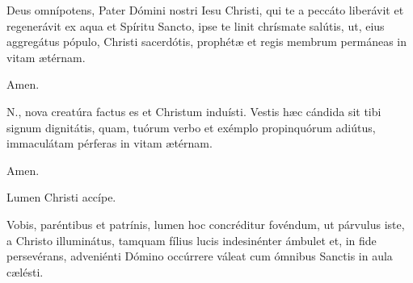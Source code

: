 
Deus omnípotens, Pater Dómini nostri Iesu Christi, qui te a peccáto liberávit et regenerávit ex aqua et
Spíritu Sancto, ipse te linit chrísmate salútis, ut, eius aggregátus pópulo, Christi sacerdótis,
prophétæ et regis membrum permáneas in vitam ætérnam.

 Amen.



 {\color{red}N.}, nova creatúra factus es et Christum induísti.
Vestis hæc cándida sit tibi signum dignitátis, quam, tuórum verbo et exémplo propinquórum adiútus,
immaculátam pérferas in vitam ætérnam.

 Amen.



 Lumen Christi accípe.


 Vobis, paréntibus et patrínis, lumen hoc concréditur fovéndum,
ut párvulus iste, a Christo illuminátus, tamquam fílius lucis indesinénter ámbulet et,
in fide persevérans, adveniénti Dómino occúrrere váleat cum ómnibus Sanctis in aula
cælésti.

